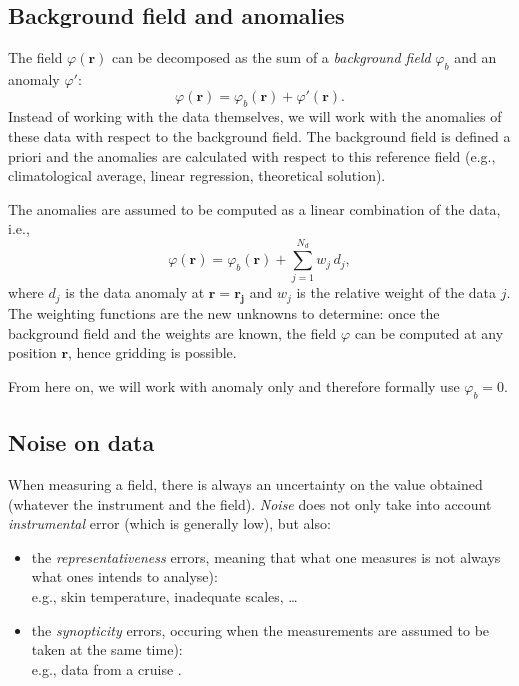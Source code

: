 \subsection{Background field and anomalies}

The field $\varphi(\mathbf{r})$ can be decomposed as the sum of a \textit{background field}  $\varphi_b$ and an anomaly $\varphi'$: 
\begin{equation}
 \varphi(\mathbf{r}) = \varphi_b(\mathbf{r}) + \varphi'(\mathbf{r}).
 \label{background}
\end{equation}
Instead of working with the data themselves, we will work with the anomalies of these data with respect to the background field. The background field is defined a priori and the anomalies are calculated with respect to this reference field (e.g., climatological average, linear regression, theoretical solution). 

The anomalies are assumed to be computed as a linear combination of the data, i.e., 
\begin{equation}
\varphi(\mathbf{r}) = \varphi_b(\mathbf{r}) + \sum_{j=1}^{N_d} w_j\, d_j,
\label{objectiveanal}
\end{equation}
where $d_{j}$ is the data anomaly at $\mathbf{r}= \mathbf{r_{j}}$ and $w_j$ is the relative weight of the data $j$. The weighting functions are the new unknowns to determine: once the background field and the weights are known, the field $\varphi$ can be computed at any position $\mathbf{r}$, hence gridding is possible.

From here on, we will work with anomaly only and therefore formally use $\varphi_{b}=0$.

\subsection{Noise on data}

When measuring a field, there is always an uncertainty on the value obtained (whatever the instrument and the field). \textit{Noise}  does not only take into account \textit{instrumental} error (which is generally low), but also:
\begin{itemize}
\item the \textit{representativeness} errors, meaning that what one measures is not always what ones intends to analyse):\\
e.g., skin temperature, inadequate scales, \ldots
\item the \textit{synopticity} errors, occuring when the measurements are assumed to be taken at the same time):\\
e.g., data from a cruise \citep{RIXEN01}.
\end{itemize}

